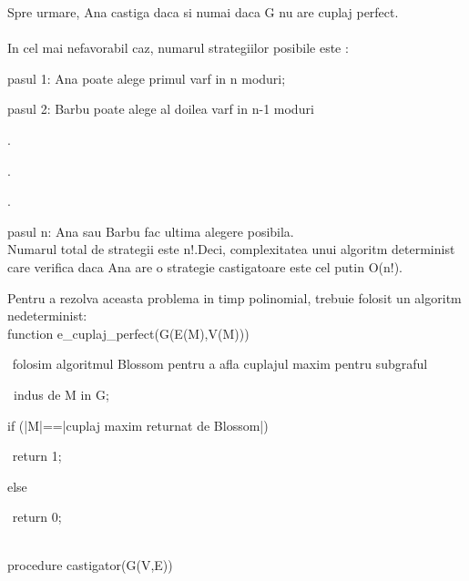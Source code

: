 Spre urmare, Ana castiga daca si numai daca G nu are cuplaj perfect.\\\\

In cel mai nefavorabil caz, numarul strategiilor posibile este : 

pasul 1: Ana poate alege primul varf in n moduri;

pasul 2: Barbu poate alege al doilea varf in n-1 moduri

.

.

.

pasul n: Ana sau Barbu fac ultima alegere posibila.\\

Numarul total de strategii este n!.Deci, complexitatea unui algoritm determinist care verifica daca Ana are o strategie castigatoare este cel putin O(n!).

Pentru a rezolva aceasta problema in timp polinomial, trebuie folosit un algoritm nedeterminist: \\

function e_cuplaj_perfect(G(E(M),V(M)))

{

$\hspace{5pt}$folosim algoritmul Blossom pentru a afla cuplajul maxim pentru subgraful 

$\hspace{6pt}$indus de M in G;

if (|M|==|cuplaj maxim returnat de Blossom|)

$\hspace{5pt}$return 1;

else 

$\hspace{5pt}$return 0;

}\\

procedure castigator(G(V,E))

